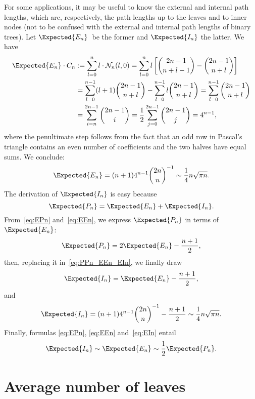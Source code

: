 For some applications, it may be useful to know the external and
internal path lengths, which are, respectively, the path lengths up to
the leaves and to inner nodes (not to be confused with the external
and internal path lengths of binary trees). Let \(\Expected{E_n}\)~be
the former and \(\Expected{I_n}\) the latter. We have
\begin{align*}
\Expected{E_n} \cdot C_n
  &:= \sum_{l=0}^{n} l \cdot \mathcal{N}_n(l,0)
   = \sum_{l=0}^{n}l\left[\binom{2n-1}{n+l-1} -
     \binom{2n-1}{n+l}\right]\\
  &= \sum_{l=0}^{n-1}(l+1)\binom{2n-1}{n+l} -
     \sum_{l=0}^{n-1}l \binom{2n-1}{n+l}
   = \sum_{l=0}^{n-1}\binom{2n-1}{n+l}\\
  &= \sum_{i=n}^{2n-1}\binom{2n-1}{i}
   = \frac{1}{2}\sum_{j=0}^{2n-1}\binom{2n-1}{j} = 4^{n-1},
\end{align*}
where the penultimate step follows from the fact that an odd row in
Pascal's triangle contains an even number of coefficients and the two
halves have equal sums. We conclude:
\begin{equation}
\Expected{E_n} = (n+1) 4^{n-1}\binom{2n}{n}^{-1} \sim
\frac{1}{4}n\sqrt{\pi n}.
\label{eq:EEn}
\end{equation}
The derivation of \(\Expected{I_n}\) is easy because
\begin{equation}
\Expected{P_n} = \Expected{E_n} + \Expected{I_n}.
\label{eq:PPn_EEn_EIn}
\end{equation}
From~\eqref{eq:EPn} and~\eqref{eq:EEn}, we express \(\Expected{P_n}\)
in terms of \(\Expected{E_n}\):
\begin{equation*}
\Expected{P_n} = 2 \Expected{E_n} - \frac{n+1}{2},
\end{equation*}
then, replacing it in~\eqref{eq:PPn_EEn_EIn}, we finally draw
\begin{equation*}
\Expected{I_n} = \Expected{E_n} - \frac{n+1}{2},
\end{equation*}
and
\begin{equation}
\Expected{I_n}
  = (n+1)4^{n-1}\binom{2n}{n}^{-1} - \frac{n+1}{2} \sim
  \frac{1}{4}n\sqrt{\pi n}.
\label{eq:EIn}
\end{equation}
Finally, formulas \eqref{eq:EPn}, \eqref{eq:EEn} and~\eqref{eq:EIn}
entail
\begin{equation*}
\Expected{I_n} \sim \Expected{E_n} \sim \frac{1}{2}\Expected{P_n}.
\end{equation*}

\section{Average number of leaves}

